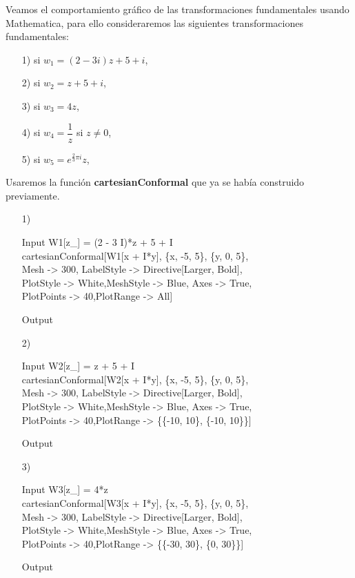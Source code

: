 \begin{Ejem}

Veamos el comportamiento gráfico de las  transformaciones fundamentales usando Mathematica, para ello consideraremos las siguientes transformaciones fundamentales:
\begin{itemize}
	\item [1)] si $w_1=(2-3i) z+ 5+i$,
	\item [2)] si $w_2=z+5+i$,
	\item [3)] si $w_3=4z$,
	\item [4)] si $w_4=\dfrac{1}{z}$ si $z\neq0$,
	\item [5)] si $w_5=e^{\frac{2}{3}\pi i}z$,
\end{itemize}
Usaremos la función \textbf{cartesianConformal} que ya se había construido previamente.
\begin{itemize}
	\item [1)] \begin{mmaCell}{Input}
		 W1[z_] = (2 - 3 I)*z + 5 + I\\cartesianConformal[W1[x + I*y], \{x, -5, 5\}, \{y, 0, 5\},\\Mesh -> 300, LabelStyle -> Directive[Larger, Bold],\\PlotStyle -> White,MeshStyle -> Blue, Axes -> True,\\PlotPoints -> 40,PlotRange -> All]
	\end{mmaCell}
	\begin{mmaCell}[moregraphics={moreig={scale=0.7}}]{Output}
	\end{mmaCell}

	\item [2)] \begin{mmaCell}{Input}
		W2[z_] = z + 5 + I\\cartesianConformal[W2[x + I*y], \{x, -5, 5\}, \{y, 0, 5\},\\Mesh -> 300, LabelStyle -> Directive[Larger, Bold],\\PlotStyle -> White,MeshStyle -> Blue, Axes -> True,\\PlotPoints -> 40,PlotRange -> \{\{-10, 10\}, \{-10, 10\}\}]
	\end{mmaCell}
	\begin{mmaCell}[moregraphics={moreig={scale=0.7}}]{Output}
	\end{mmaCell}

	\item [3)] \begin{mmaCell}{Input}
		W3[z_] = 4*z \\cartesianConformal[W3[x + I*y], \{x, -5, 5\}, \{y, 0, 5\},\\Mesh -> 300, LabelStyle -> Directive[Larger, Bold],\\PlotStyle -> White,MeshStyle -> Blue, Axes -> True,\\PlotPoints -> 40,PlotRange -> \{\{-30, 30\}, \{0, 30\}\}]
	\end{mmaCell}
	\begin{mmaCell}[moregraphics={moreig={scale=0.7}}]{Output}
	\end{mmaCell}


\end{itemize}
\end{Ejem}
